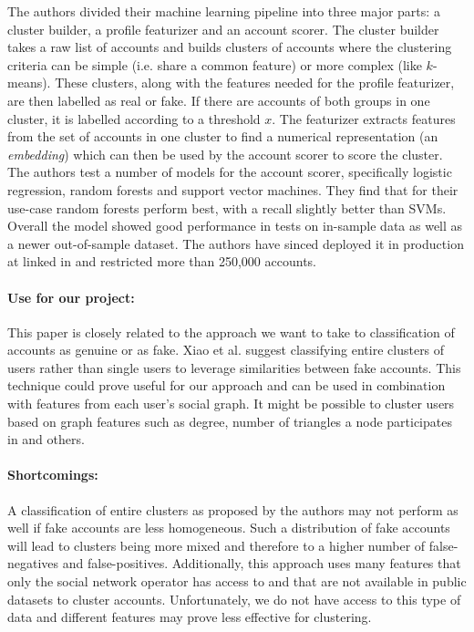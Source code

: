 The authors divided their machine learning pipeline into three major parts: a cluster builder, a profile featurizer and an account scorer. The cluster builder takes a raw list of accounts and builds clusters of accounts where the clustering criteria can be simple (i.e. share a common feature) or more complex (like $k$-means). These clusters, along with the features needed for the profile featurizer, are then labelled as real or fake. If there are accounts of both groups in one cluster, it is labelled according to a threshold $x$. The featurizer extracts features from the set of accounts in one cluster to find a numerical representation (an \emph{embedding}) which can then be used by the account scorer to score the cluster. The authors test a number of models for the account scorer, specifically logistic regression, random forests and support vector machines. They find that for their use-case random forests perform best, with a recall slightly better than SVMs. Overall the model showed good performance in tests on in-sample data as well as a newer out-of-sample dataset. The authors have sinced deployed it in production at linked in and restricted more than 250,000 accounts.

\paragraph{Use for our project:}
This paper is closely related to the approach we want to take to classification of accounts as genuine or as fake. Xiao et al. suggest classifying entire clusters of users rather than single users to leverage similarities between fake accounts. This technique could prove useful for our approach and can be used in combination with features from each user's social graph. It might be possible to cluster users based on graph features such as degree, number of triangles a node participates in and others.

\paragraph{Shortcomings:} A classification of entire clusters as proposed by the authors may not perform as well if fake accounts are less homogeneous. Such a distribution of fake accounts will lead to clusters being more mixed and therefore to a higher number of false-negatives and false-positives. Additionally, this approach uses many features that only the social network operator has access to and that are not available in public datasets to cluster accounts. Unfortunately, we do not have access to this type of data and different features may prove less effective for clustering.


